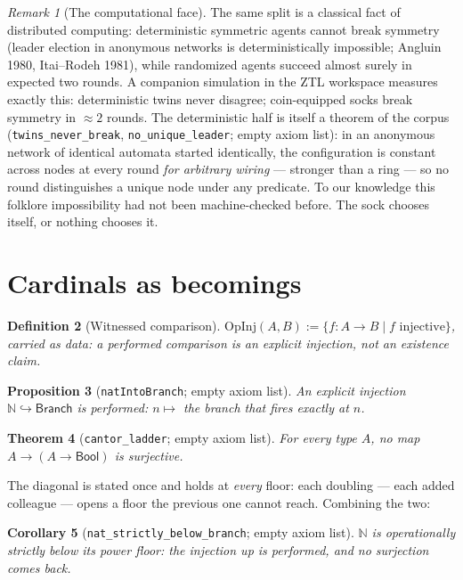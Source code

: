 \documentclass[11pt]{article}
\newtheorem{thm}{Theorem}[section]
\newtheorem{defn}[thm]{Definition}
\newtheorem{prop}[thm]{Proposition}
\newtheorem{cor}[thm]{Corollary}
\theoremstyle{remark}
\newtheorem{rem}[thm]{Remark}
\newcommand{\N}{\mathbb{N}}
\newcommand{\Branch}{\textsf{Branch}}
\begin{document}
\begin{rem}[The computational face]
The same split is a classical fact of distributed computing:
deterministic symmetric agents cannot break symmetry (leader election in
anonymous networks is deterministically impossible; Angluin 1980,
Itai--Rodeh 1981), while randomized agents succeed almost surely in
expected two rounds.  A companion simulation in the ZTL workspace
measures exactly this: deterministic twins never disagree; coin-equipped
socks break symmetry in $\approx 2$ rounds.  The deterministic half is
itself a theorem of the corpus (\texttt{twins\_never\_break},
\texttt{no\_unique\_leader}; empty axiom list): in an anonymous network
of identical automata started identically, the configuration is constant
across nodes at every round \emph{for arbitrary wiring} --- stronger
than a ring --- so no round distinguishes a unique node under any
predicate.  To our knowledge this folklore impossibility had not been
machine-checked before.  The sock chooses itself, or nothing chooses
it.
\end{rem}

\section{Cardinals as becomings}
\label{sec:cardinals}

\begin{defn}[Witnessed comparison]
$\mathrm{OpInj}(A,B) := \{ f : A \to B \mid f \text{ injective} \}$,
carried as \emph{data}: a performed comparison is an explicit injection,
not an existence claim.
\end{defn}

\begin{prop}[\texttt{natIntoBranch}; empty axiom list]
An explicit injection $\N \hookrightarrow \Branch$ is performed:
$n \mapsto$ the branch that fires exactly at $n$.
\end{prop}

\begin{thm}[\texttt{cantor\_ladder}; empty axiom list]
For every type $A$, no map $A \to (A \to \mathsf{Bool})$ is surjective.
\end{thm}

The diagonal is stated once and holds at \emph{every} floor: each
doubling --- each added colleague --- opens a floor the previous one
cannot reach.  Combining the two:

\begin{cor}[\texttt{nat\_strictly\_below\_branch}; empty axiom list]
$\N$ is operationally strictly below its power floor: the injection up
is performed, and no surjection comes back.
\end{cor}
\end{document}
